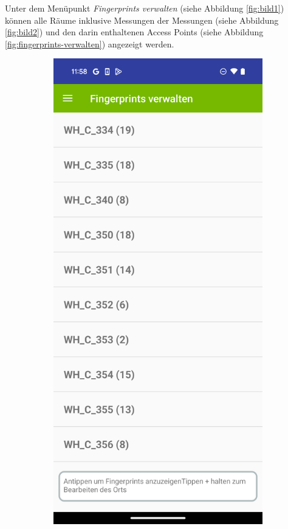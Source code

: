Unter dem Menüpunkt \textit{Fingerprints verwalten} (siehe Abbildung \ref{fig:bild1}) können alle Räume inklusive Messungen der Messungen (siehe Abbildung \ref{fig:bild2}) und den darin enthaltenen Access Points (siehe Abbildung \ref{fig:fingerprints-verwalten}) angezeigt werden.

\begin{figure}[h!]
    \centering
    \begin{subfigure}[b]{0.3\textwidth}
        \centering
        \includegraphics[width=\textwidth]{images/screenshots/all_rooms.png}

\end{subfigure}
\end{figure}
